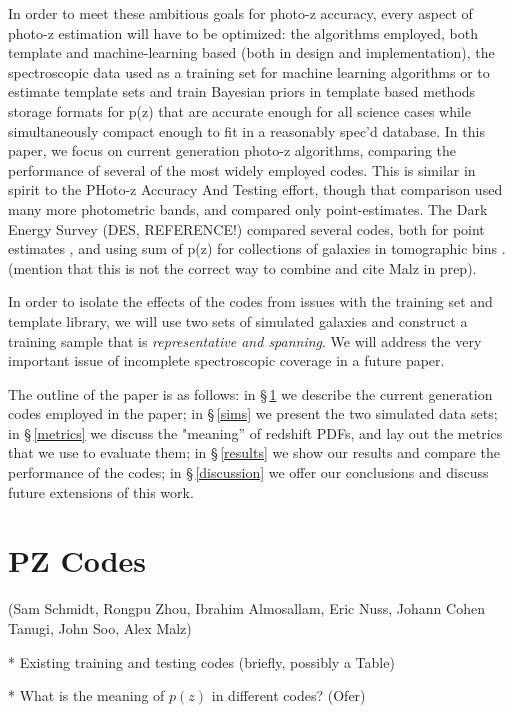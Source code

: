 \documentclass[usenatbib]{mn2e}
\begin{document}
In order to meet these ambitious goals for photo-z accuracy, every aspect of photo-z estimation will have to be optimized: the algorithms employed, both template and machine-learning based (both in design and implementation),  the spectroscopic data used as a training set for machine learning algorithms or to estimate template sets and train Bayesian priors in template based methods
storage formats for p(z) that are accurate enough for all science cases while simultaneously compact enough to fit in a reasonably spec'd database.
In this paper, we focus on current generation photo-z algorithms, comparing the performance of several of the most widely employed codes.  This is similar in spirit to the PHoto-z Accuracy And Testing \citep[PHAT;][]{Hildebrandt:10} effort, though that comparison used many more photometric bands, and compared only point-estimates.  The Dark Energy Survey (DES, REFERENCE!) compared several codes, both for point estimates \citep[]{Sanchez:14}, and using sum of p(z) for collections of galaxies in tomographic bins \citep[]{Bonnett:16}. (mention that this is not the correct way to combine and cite Malz in prep).  

In order to isolate the effects of the codes from issues with the training set and template library, we will use two sets of simulated galaxies and construct a training sample that is {\it representative and spanning}.  We will address the very important issue of incomplete spectroscopic coverage in a future paper.

The outline of the paper is as follows: in \S\,\ref{pzcodes} we describe the current generation codes employed in the paper; in \S\,\ref{sims} we present the two simulated data sets; in \S\,\ref{metrics} we discuss the "meaning'' of redshift PDFs, and lay out the metrics that we use to evaluate them; in \S\,\ref{results} we show our results and compare the performance of the codes; in \S\,\ref{discussion} we offer our conclusions and discuss future extensions of this work.

\section{PZ Codes}\label{pzcodes}

(Sam Schmidt, Rongpu Zhou, Ibrahim Almosallam, Eric Nuss, Johann Cohen Tanugi, John Soo, Alex Malz)

* Existing training and testing codes (briefly, possibly a Table)

* What is the meaning of $p(z)$ in different codes? (Ofer) 
\end{document}
